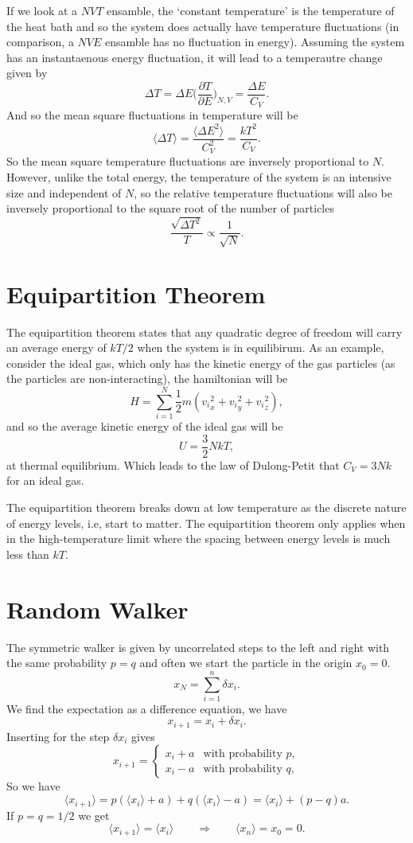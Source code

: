 \documentclass[a4paper, 11pt, notitlepage, english]{article}
\newcommand{\To}{\quad\Rightarrow\quad}
\newcommand{\p}{\partial}
\begin{document}
If we look at a $NVT$ ensamble, the `constant temperature' is the temperature of the heat bath and so the system does actually have temperature fluctuations (in comparison, a $NVE$ ensamble has no fluctuation in energy). Assuming the system has an instantaenous energy fluctuation, it will lead to a temperautre change given by
$$\Delta T  = \Delta E \bigg(\frac{\p T}{\p E}\bigg)_{N,V} = \frac{\Delta E}{C_V}.$$
And so the mean square fluctuations in temperature will be
$$\langle \Delta T \rangle = \frac{\langle \Delta E^2 \rangle}{C_V^2} = \frac{kT^2}{C_V}.$$
So the mean square temperature fluctuations are inversely proportional to $N$. However, unlike the total energy, the temperature of the system is an intensive size
and independent
of $N$,
 so the relative 
temperature fluctuations will also be inversely proportional to the square root of the number of particles
$$\frac{\sqrt{\Delta T^2}}{T} \propto \frac{1}{\sqrt{N}}.$$

\clearpage

\section*{Equipartition Theorem}

The equipartition theorem states that any quadratic degree of freedom will carry an average energy of $kT/2$ when the system is in equilibirum. As an example, consider the ideal gas, which only has the kinetic energy of the gas particles (as the particles are non-interacting), the hamiltonian will be
$$H = \sum_{i=1}^N \frac{1}{2}m({v_i}_x^2+{v_i}_y^2+{v_i}_z^2),$$
and so the average kinetic energy of the ideal gas will be
$$U = \frac{3}{2}NkT,$$
at thermal equilibrium. Which leads to the law of Dulong-Petit that $C_V = 3Nk$ for an ideal gas.

The equipartition theorem breaks down at low temperature as the discrete nature of energy levels, i.e, start to matter. The equipartition theorem only applies when in the high-temperature limit where the spacing between energy levels is much less than $kT$.

\clearpage

\section*{Random Walker}

The symmetric walker is given by uncorrelated steps to the left and right with the same probability $p=q$ and often we start the particle in the origin $x_0 = 0$.
$$x_N = \sum_{i=1}^n \delta x_i.$$
We find the expectation as a difference equation, we have
$$x_{i+1} = x_{i} + \delta x_i.$$
Inserting for the step $\delta x_i$ gives
$$x_{i+1} = \begin{cases}
	x_i + a & \mbox{with probability } p, \\
	x_i - a & \mbox{with probability } q,
\end{cases}$$
So we have
$$\langle x_{i+1} \rangle = p(\langle x_i \rangle + a) + q(\langle x_i \rangle - a) = \langle x_i \rangle + (p-q)a.$$
If $p=q=1/2$ we get
$$\langle x_{i+1} \rangle = \langle x_i \rangle \quad \To \quad \langle x_n \rangle = x_0 = 0.$$
\end{document}

